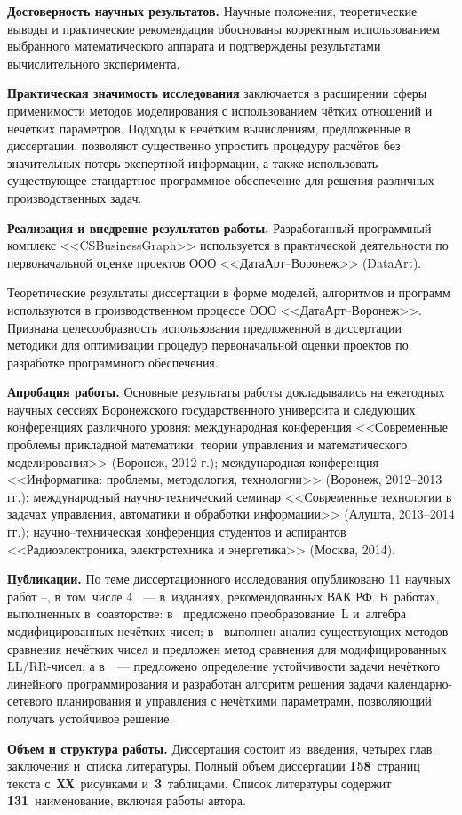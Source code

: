 \textbf{Достоверность научных результатов.} Научные положения, теоретические выводы и практические рекомендации обоснованы корректным использованием выбранного математического аппарата и подтверждены результатами вычислительного эксперимента.

\textbf{Практическая значимость исследования} заключается в расширении сферы применимости методов моделирования с использованием чётких отношений и нечётких параметров. Подходы к нечётким вычислениям, предложенные в диссертации, позволяют существенно упростить процедуру расчётов без значительных потерь экспертной информации, а также использовать существующее стандартное программное обеспечение для решения различных производственных задач.

\textbf{Реализация и внедрение результатов работы.} Разработанный программный комплекс <<CSBusinessGraph>> используется в практической деятельности по первоначальной оценке проектов ООО <<ДатаАрт--Воронеж>> (DataArt).

Теоретические результаты диссертации в форме моделей, алгоритмов и программ используются в производственном процессе ООО <<ДатаАрт--Воронеж>>. Признана целесообразность использования предложенной в диссертации методики для оптимизации процедур первоначальной оценки проектов по разработке программного обеспечения.

\textbf{Апробация работы.} Основные результаты работы докладывались на ежегодных научных сессиях Воронежского государственного университа и следующих конференциях различного уровня: международная конференция <<Современные проблемы прикладной математики, теории управления и математического моделирования>> (Воронеж, 2012 г.); международная конференция <<Информатика: проблемы, методология, технологии>> (Воронеж, 2012--2013 гг.); международный научно-технический семинар <<Современные технологии в задачах управления, автоматики и обработки информации>> (Алушта, 2013--2014 гг.); научно--техническая конференция студентов и аспирантов <<Радиоэлектроника, электротехника и энергетика>> (Москва, 2014).

\textbf{Публикации.} По теме диссертационного исследования опубликовано 11 научных работ \cite{PMTYMM}--\cite{Kanischeva}, в~том~числе 4 \cite{Kanischeva, Vorontsov_Compare, Vorontsov_PI, Vorontsov_VSTU}~--- в~изданиях, рекомендованных ВАК РФ. В~работах, выполненных в~соавторстве: в~\cite{Vorontsov_PI} предложено преобразование~L и~алгебра модифицированных нечётких чисел; в~\cite{Vorontsov_Compare} выполнен анализ существующих методов сравнения нечётких чисел и предложен метод сравнения для модифицированных LL/RR-чисел; а в~\cite{Vorontsov_VSTU}~--- предложено определение устойчивости задачи нечёткого линейного программирования и разработан алгоритм решения задачи календарно-сетевого планирования и управления с нечёткими параметрами, позволяющий получать устойчивое решение.

\textbf{Объем и структура работы.} Диссертация состоит из~введения, четырех глав, заключения и~списка литературы. Полный объем диссертации \textbf{158}~страниц текста с~\textbf{ХХ}~рисунками и~\textbf{3}~таблицами. Список литературы содержит \textbf{131}~наименование, включая работы автора.